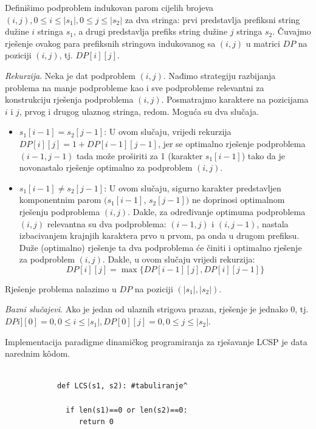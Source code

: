 \begin{solution}
	    Definišimo podproblem indukovan parom cijelih brojeva $(i,j), 0 \leq i \leq |s_1|, 0 \leq j \leq |s_2|$  za dva stringa: prvi predstavlja  prefiksni string dužine $i$ stringa $s_1$,  a drugi predstavlja prefiks string dužine $j$ stringa $s_2$.  Čuvajmo rješenje ovakog para prefiksnih stringova indukovanog sa $(i,j)$ u matrici $DP$ na poziciji $(i, j)$, tj. $DP[i][j]$.
	    
	    \textit{Rekurzija}. Neka je dat podproblem $(i, j)$. Nađimo strategiju razbijanja problema na manje podprobleme kao i sve podprobleme relevantni za konstrukciju rješenja podproblema $(i, j)$. Posmatrajmo karaktere na pozicijama $i$ i $j$, prvog i drugog ulaznog stringa, redom.  Moguća su dva slučaja.
	    \begin{itemize}
	    	\item $s_1[i-1] = s_2[j-1]$: U ovom slučaju, vrijedi rekurzija $DP[i][j] = 1 + DP[i-1][j-1]$, jer  se optimalno rješenje podproblema $(i-1, j-1)$ tada može proširiti za 1 (karakter $s_1[i-1]$) tako da je novonastalo rješenje optimalno za podproblem $(i,j)$.
	    	\item  $s_1[i-1] \neq s_2[j-1]$: U ovom slučaju, sigurno karakter predstavljen komponentnim parom  $(s_1[i-1]$, $s_2[j-1])$ ne doprinosi optimalnom rješenju podproblema $(i,j)$. Dakle,  za određivanje optimuma podproblema $(i,j)$ relevantna su dva podproblema: $(i-1, j)$ i $(i, j-1)$, nastala izbacivanjem krajnjih karaktera prvo u prvom, pa onda u drugom prefiksu. Duže (optimalno) rješenje ta dva podproblema će činiti i optimalno rješenje za podproblem $(i,j)$. Dakle, u ovom slučaju vrijedi rekurzija:
	    	$$DP[i][j] = \max \{ DP[i-1][j], DP[i][j-1] \} $$ 
	    	
	    \end{itemize}
	    Rješenje problema nalazimo u $DP$ na poziciji $(|s_1|, |s_2|)$. 
	    
	    \textit{Bazni slučajevi}. Ako je jedan od ulaznih strigova prazan, rješenje je jednako 0, tj.  $DPi][0]= 0, 0 \leq i \leq |s_1|,  DP[0][j] = 0, 0 \leq j \leq |s_2|$. 
	    
	 Implementacija paradigme dinamičkog programiranja za rješavanje LCSP je data narednim k\^odom. 
 \begin{verbatim}
	    	
	    	def LCS(s1, s2): #tabuliranje^
	    	      
	    	  if len(s1)==0 or len(s2)==0:
	    	     return 0
	    	     

\end{verbatim}
\end{solution}
